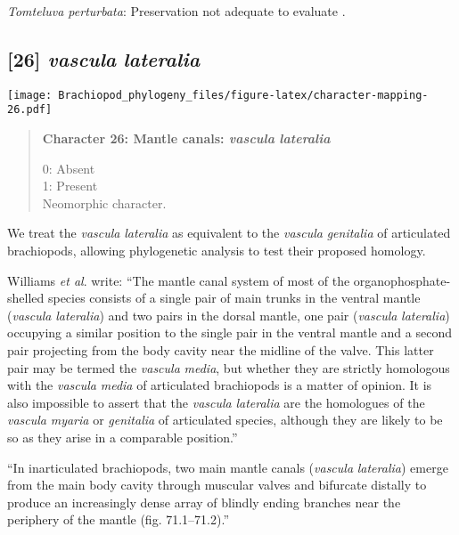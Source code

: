 \documentclass[openany]{book}
\theoremstyle{definition}
\theoremstyle{definition}
\theoremstyle{definition}
\theoremstyle{remark}
\begin{document}
\hypertarget{Tomteluva_perturbata-coding-25}{}
\emph{Tomteluva perturbata}: Preservation not adequate to evaluate
\citep{Streng2016Anew}.

\subsection*{\texorpdfstring{{[}26{]} \emph{vascula}
\emph{lateralia}}{{[}26{]} vascula lateralia}}\label{vascula-lateralia}

\texttt{[image: Brachiopod\_phylogeny\_files/figure-latex/character-mapping-26.pdf]}

\begin{quote}
\textbf{Character 26: Mantle canals: \emph{vascula} \emph{lateralia}}

0: Absent\\
1: Present\\
Neomorphic character.
\end{quote}

We treat the \emph{vascula} \emph{lateralia} as equivalent to the
\emph{vascula} \emph{genitalia} of articulated brachiopods, allowing
phylogenetic analysis to test their proposed homology.

Williams \emph{et al}. \citeyearpar{Williams1997Introduction} write:
``The mantle canal system of most of the organophosphate-shelled species
consists of a single pair of main trunks in the ventral mantle
(\emph{vascula} \emph{lateralia}) and two pairs in the dorsal mantle,
one pair (\emph{vascula} \emph{lateralia}) occupying a similar position
to the single pair in the ventral mantle and a second pair projecting
from the body cavity near the midline of the valve. This latter pair may
be termed the \emph{vascula} \emph{media}, but whether they are strictly
homologous with the \emph{vascula} \emph{media} of articulated
brachiopods is a matter of opinion. It is also impossible to assert that
the \emph{vascula} \emph{lateralia} are the homologues of the
\emph{vascula} \emph{myaria} or \emph{genitalia} of articulated species,
although they are likely to be so as they arise in a comparable
position.''

``In inarticulated brachiopods, two main mantle canals (\emph{vascula}
\emph{lateralia}) emerge from the main body cavity through muscular
valves and bifurcate distally to produce an increasingly dense array of
blindly ending branches near the periphery of the mantle (fig.
71.1--71.2).''
\end{document}
